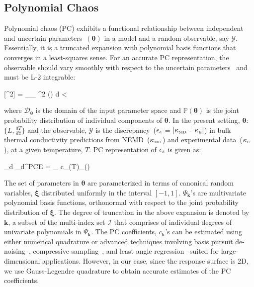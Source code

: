 \subsection{Polynomial Chaos}

Polynomial chaos (PC) exhibits a functional relationship between independent and uncertain 
parameters~$(\bm{\theta})$ 
in a model and a random observable, say $\mathcal{Y}$. Essentially, it is a truncated expansion with polynomial 
basis functions that converges in a least-squares sense. For an accurate PC representation, the observable should
vary smoothly with respect to the uncertain parameters~\cite{Vohra:2014}  and must
be L-2 integrable:

\be
{}[^2] = \int_{_{\bm{\theta}}} ^2 (\bm{\theta}) 
d\bm{\theta} < \infty
\ee

\noindent where $\mathcal{D}_{\bm{\theta}}$ is the domain of the input parameter space and 
$\mathbb{P}(\bm{\theta})$ is the joint probability distribution of individual components of $\bm{\theta}$.
In the present setting, $\bm{\theta}$:~$\{L,\frac{dT}{dz}\}$ and the observable, $\mathcal{Y}$ is the
discrepancy~($\epsilon_{\mbox{\tiny{d}}}$ = 
$\lvert\kappa_{\mbox{\tiny{MD}}}$ - $\kappa_{\mbox{\tiny{E}}}\rvert$)
in bulk thermal conductivity predictions from 
NEMD~($\kappa_{\mbox{\tiny{MD}}}$) and experimental data~($\kappa_{\mbox{\tiny{E}}}$), at a 
given temperature, $T$. PC representation of $\epsilon_{\mbox{\tiny{d}}}$ is given as:

\be
\epsilon_{\mbox{\tiny{d}}} \approx \mathcal{\epsilon}_{\mbox{\tiny{d}}}^{\mbox{\tiny{PCE}}} = 
\sum_{\in{}} c_{}(T)\Psi_{}(\bm{\xi(\theta)}) 
\ee

\noindent The set of parameters in $\bm{\theta}$ are parameterized in terms of canonical random 
variables, $\bm{\xi}$ distributed uniformly in the interval $[-1,1]$. 
 $\Psi_{\bm{k}}$'s are multivariate polynomial basis functions, orthonormal with respect to the joint probability 
 distribution of $\bm{\xi}$. The degree of truncation in the above expansion is denoted by $\bm{k}$, a subset of
 the multi-index set $\mathcal{I}$ that comprises of individual degrees of univariate polynomials in $\Psi_{\bm{k}}$.
The PC coefficients, $c_{\bm{k}}$'s can be estimated using either numerical quadrature or advanced techniques
involving basis pursuit de-noising~\cite{Peng:2014}, compressive
sampling~\cite{Hampton:2015}, and least angle regression~\cite{Blatman:2011} suited for large-dimensional
applications. However, in our case, since the response surface is 2D, we use Gauss-Legendre quadrature to
obtain accurate estimates of the PC coefficients. 
\bigskip

